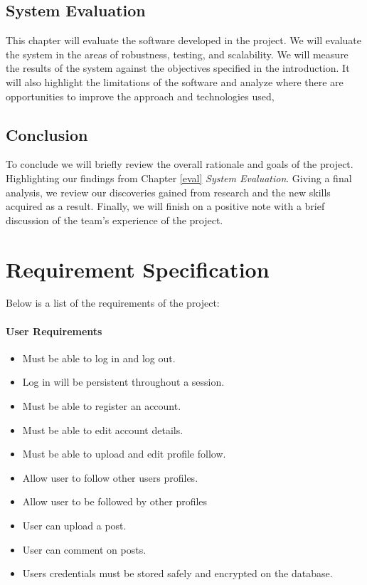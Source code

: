 \subsection{System Evaluation}
This chapter will evaluate the software developed in the project. We will evaluate the system in the areas of robustness, testing, and scalability. We will measure the results of the system against the objectives specified in the introduction. It will also highlight the limitations of the software and analyze where there are opportunities to improve the approach and technologies used,

\subsection{Conclusion}
To conclude we will briefly review the overall rationale and goals of the project. Highlighting our findings from  Chapter \ref{eval} \textit{System Evaluation}. Giving a final analysis, we review our discoveries gained from research and the new skills acquired as a result. Finally, we will finish on a positive note with a brief discussion of the team's experience of the project.

\section{Requirement Specification}
Below is a list of the requirements of the project:

\paragraph{User Requirements} \label{userreq}
\begin{itemize}
    \item Must be able to log in and log out.
    \item Log in will be persistent throughout a session. 
    \item Must be able to register an account.
    \item Must be able to edit account details.
    \item Must be able to upload and edit profile follow.
    \item Allow user to follow other users profiles.
    \item Allow user to be followed by other profiles
    \item User can upload a post.
    \item User can comment on posts.
    \item Users credentials must be stored safely and encrypted on the database.
\end{itemize}